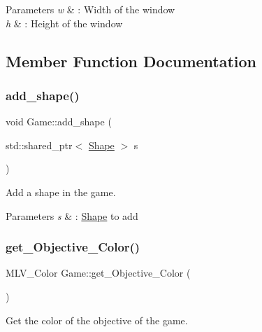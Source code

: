 \begin{DoxyParams}{Parameters}
{\em w} & \+: Width of the window \\
\hline
{\em h} & \+: Height of the window \\
\hline
\end{DoxyParams}


\subsection{Member Function Documentation}
\mbox{\label{classGame_aab43fea0e202c203d998ae575d3f6eeb}} 
\subsubsection{\texorpdfstring{add\+\_\+shape()}{add\_shape()}}
{\footnotesize\ttfamily void Game\+::add\+\_\+shape (\begin{DoxyParamCaption}\item[{std\+::shared\+\_\+ptr$<$ \hyperlink{classShape}{Shape} $>$}]{s }\end{DoxyParamCaption})}



Add a shape in the game. 


\begin{DoxyParams}{Parameters}
{\em s} & \+: \hyperlink{classShape}{Shape} to add \\
\hline
\end{DoxyParams}
\mbox{\label{classGame_ac5de4b11ae90a7ea9182621039fa511c}} 
\subsubsection{\texorpdfstring{get\+\_\+\+Objective\+\_\+\+Color()}{get\_Objective\_Color()}}
{\footnotesize\ttfamily M\+L\+V\+\_\+\+Color Game\+::get\+\_\+\+Objective\+\_\+\+Color (\begin{DoxyParamCaption}{ }\end{DoxyParamCaption})}



Get the color of the objective of the game. 

